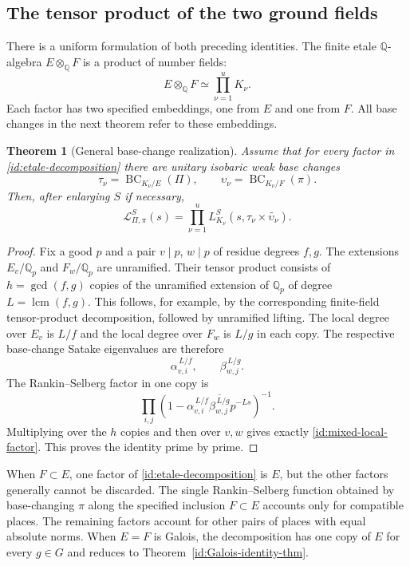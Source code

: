 \documentclass[11pt,reqno]{amsart}
\numberwithin{equation}{section}
\newtheorem{theorem}{Theorem}[section]
\theoremstyle{definition}
\theoremstyle{remark}
\newcommand{\Q}{\mathbb Q}
\begin{document}
\subsection{The tensor product of the two ground fields}
There is a uniform formulation of both preceding identities. The finite
etale $\Q$-algebra $E\otimes_\Q F$ is a product of number fields:
\begin{equation}\label{id:etale-decomposition}
 E\otimes_\Q F\simeq\prod_{\nu=1}^{u}K_\nu.
\end{equation}
Each factor has two specified embeddings, one from $E$ and one from $F$.
All base changes in the next theorem refer to these embeddings.

\begin{theorem}[General base-change realization]\label{id:general-BC}
Assume that for every factor in \eqref{id:etale-decomposition} there are
unitary isobaric weak base changes
\[
 \tau_\nu=\operatorname{BC}_{K_\nu/E}(\Pi),\qquad
 \upsilon_\nu=\operatorname{BC}_{K_\nu/F}(\pi).
\]
Then, after enlarging $S$ if necessary,
\begin{equation}\label{id:general-BC-identity}
 \mathscr L_{\Pi,\pi}^S(s)=
 \prod_{\nu=1}^{u}
 L_{K_\nu}^S(s,\tau_\nu\times\widetilde{\upsilon_\nu}).
\end{equation}
\end{theorem}

\begin{proof}
Fix a good $p$ and a pair $v\mid p$, $w\mid p$ of residue degrees $f,g$.
The extensions $E_v/\Q_p$ and $F_w/\Q_p$ are unramified. Their tensor
product consists of $h=\gcd(f,g)$ copies of the unramified extension of
$\Q_p$ of degree $L=\operatorname{lcm}(f,g)$. This follows, for example,
by the corresponding finite-field tensor-product decomposition, followed
by unramified lifting. The local degree over $E_v$ is $L/f$ and the local
degree over $F_w$ is $L/g$ in each copy. The respective base-change
Satake eigenvalues are therefore
\[
 \alpha_{v,i}^{\,L/f},\qquad \beta_{w,j}^{\,L/g}.
\]
The Rankin--Selberg factor in one copy is
\[
 \prod_{i,j}
 \left(1-\alpha_{v,i}^{\,L/f}
       \overline{\beta_{w,j}^{\,L/g}}p^{-Ls}\right)^{-1}.
\]
Multiplying over the $h$ copies and then over $v,w$ gives exactly
\eqref{id:mixed-local-factor}. This proves the identity prime by prime.
\end{proof}

When $F\subset E$, one factor of \eqref{id:etale-decomposition} is $E$,
but the other factors generally cannot be discarded. The single
Rankin--Selberg function obtained by base-changing $\pi$ along the
specified inclusion $F\subset E$ accounts only for compatible places.
The remaining factors account for other pairs of places with equal
absolute norms. When $E=F$ is Galois, the decomposition has one copy of
$E$ for every $g\in G$ and reduces to
Theorem~\ref{id:Galois-identity-thm}.
\end{document}
